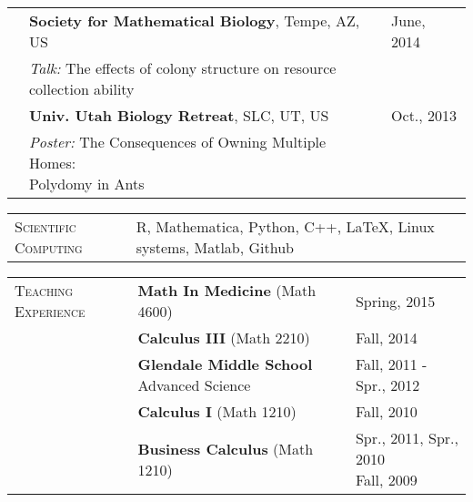 \documentclass[11pt]{article}
\newcommand{\cellone}{2.5cm}
\newcommand{\celltwo}{12cm}
\newcommand{\cellthree}{4cm}
\newcommand{\latex}{\LaTeX}
\newcommand{\spa}{\vspace{.4in}}
\begin{document}
\begin{tabularx}{\textwidth}{p{\cellone} p{\celltwo} p{\cellthree}}
  
  & \vspace{0.1in} \parbox[t][]{\celltwo}{{\bf Society for Mathematical Biology}, Tempe, AZ, US} & \vspace{0.1in} \parbox[t][]{\cellthree}{June, 2014} \\ 
  & \hspace{.2in} \parbox[t][]{\celltwo}{ \emph{Talk: } The effects of colony structure on resource \\ collection ability} \\
  
											 
  & \vspace{0.1in} \parbox[t][0cm]{\celltwo}{{\bf Univ. Utah Biology Retreat}, SLC, UT, US } & \vspace{0.1in} \parbox[t][]{\cellthree}{Oct., 2013} \\
  & \hspace{.2in} \parbox[t][]{\celltwo}{\emph{Poster:} The Consequences of Owning Multiple Homes: \\ Polydomy in Ants}
\end{tabularx}

\spa

\begin{tabularx}{\textwidth}{p{\cellone} p{\celltwo} p{\cellthree}}
\parbox[t][0cm]{\cellone}{S\textsc{cientific} C\textsc{omputing}} & \parbox[t][0cm]{6cm}{R, Mathematica, Python, C++, \latex, Linux systems, Matlab, Github} 
\end{tabularx}

\spa

\begin{tabularx}{\textwidth}{p{\cellone} p{\celltwo} p{\cellthree}}

\parbox[t][0cm]{\cellone}{T\textsc{eaching} E\textsc{xperience}} &  \parbox[t][0cm]{\celltwo}{{\bf  Math In Medicine} (Math 4600)}  &  Spring, 2015 \\ 
					          &  \parbox[t][0cm]{\celltwo}{{\bf  Calculus III} (Math 2210)} &  Fall, 2014 \\
					          &  \parbox[t]{\celltwo}{{\bf Glendale Middle School} Advanced Science}   &  \parbox[t]{\cellthree}{Fall, 2011 - Spr., 2012} \\				
					          &  \parbox[t]{\celltwo}{{\bf Calculus I} (Math 1210)}   &  \parbox[t]{\cellthree}{Fall, 2010} \\					          
					          &  \parbox[t]{\celltwo}{{\bf  Business Calculus} (Math 1210)}   &  \parbox[t]{\cellthree}{Spr., 2011, Spr., 2010 \\ Fall, 2009 } \\

\end{tabularx}
\end{document}
